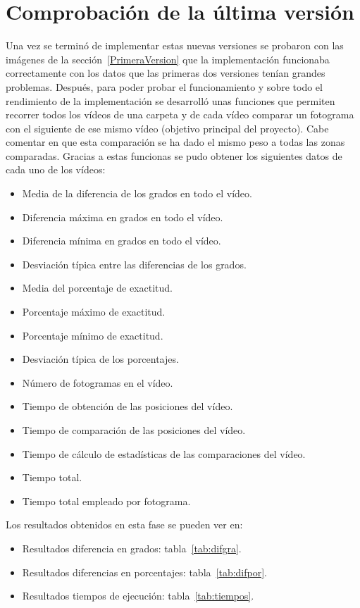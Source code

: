 {\section{Comprobación de la última versión}
Una vez se terminó de implementar estas nuevas versiones se probaron con las imágenes de la sección~\ref{PrimeraVersion} que la implementación funcionaba correctamente con los datos que las primeras dos versiones tenían grandes problemas. Después, para poder probar el funcionamiento y sobre todo el rendimiento de la implementación se desarrolló unas funciones que permiten recorrer todos los vídeos de una carpeta y de cada vídeo comparar un fotograma con el siguiente de ese mismo vídeo (objetivo principal del proyecto). Cabe comentar en que esta comparación se ha dado el mismo peso a todas las zonas comparadas. Gracias a estas funcionas se pudo obtener los siguientes datos de cada uno de los vídeos:
\begin{itemize}
	\item Media de la diferencia de los grados en todo el vídeo.
	\item Diferencia máxima en grados en todo el vídeo.
	\item Diferencia mínima en grados en todo el vídeo.
	\item Desviación típica entre las diferencias de los grados.
	\item Media del porcentaje de exactitud.
	\item Porcentaje máximo de exactitud.
	\item Porcentaje mínimo de exactitud.
	\item Desviación típica de los porcentajes.
	\item Número de fotogramas en el vídeo.
	\item Tiempo de obtención de las posiciones del vídeo.
	\item Tiempo de comparación de las posiciones del vídeo.
	\item Tiempo de cálculo de estadísticas de las comparaciones del vídeo.
	\item Tiempo total.
	\item Tiempo total empleado por fotograma.
\end{itemize}

Los resultados obtenidos en esta fase se pueden ver en:
\begin{itemize}
	\item Resultados diferencia en grados: tabla~\ref{tab:difgra}.
	\item Resultados diferencias en porcentajes: tabla~\ref{tab:difpor}.
	\item Resultados tiempos de ejecución: tabla~\ref{tab:tiempos}.
\end{itemize}

}
